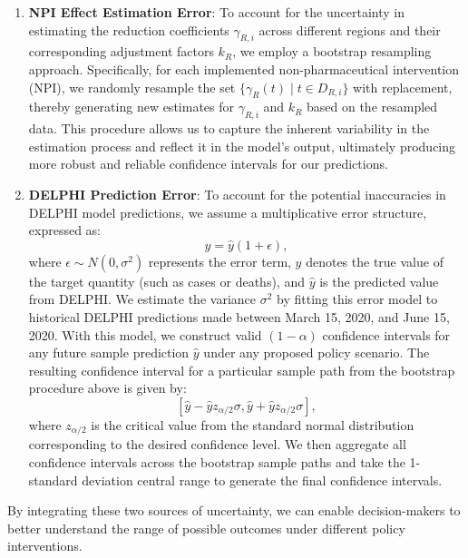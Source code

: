 \documentclass[msom,blindrev]{informs3} %
\begin{document}
\begin{enumerate}
    \item \textbf{NPI Effect Estimation Error}: To account for the uncertainty in estimating the reduction coefficients $\gamma_{R,i}$ across different regions and their corresponding adjustment factors $k_R$, we employ a bootstrap resampling approach. Specifically, for each implemented non-pharmaceutical intervention (NPI), we randomly resample the set $\{\gamma_R(t) \mid t \in D_{R,i}\}$ with replacement, thereby generating new estimates for $\gamma_{R,i}$ and $k_R$ based on the resampled data. This procedure allows us to capture the inherent variability in the estimation process and reflect it in the model's output, ultimately producing more robust and reliable confidence intervals for our predictions.

    \item \textbf{DELPHI Prediction Error}: To account for the potential inaccuracies in DELPHI model predictions, we assume a multiplicative error structure, expressed as:
    \[
    y = \hat{y}(1 + \epsilon),
    \]
    where $\epsilon \sim N(0, \sigma^2)$ represents the error term, $y$ denotes the true value of the target quantity (such as cases or deaths), and $\hat{y}$ is the predicted value from DELPHI. We estimate the variance $\sigma^2$ by fitting this error model to historical DELPHI predictions made between March 15, 2020, and June 15, 2020. With this model, we construct valid $(1-\alpha)$ confidence intervals for any future sample prediction $\hat{y}$ under any proposed policy scenario. The resulting confidence interval for a particular sample path from the bootstrap procedure above is given by:
    \[
    [\hat{y} - \hat{y}z_{\alpha/2}\sigma, \hat{y} + \hat{y}z_{\alpha/2}\sigma],
    \]
    where $z_{\alpha/2}$ is the critical value from the standard normal distribution corresponding to the desired confidence level.  We then aggregate all confidence intervals across the bootstrap sample paths and take the 1-standard deviation central range to generate the final confidence intervals.
\end{enumerate}
By integrating these two sources of uncertainty, we can enable decision-makers to better understand the range of possible outcomes under different policy interventions.
\end{document}
